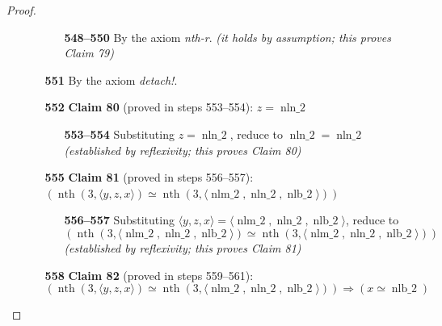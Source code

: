 \documentclass[11pt]{article}
\theoremstyle{plain}
\begin{document}
\begin{proof}
\begin{itemize}[leftmargin=2.8em, itemsep=4pt, parsep=1pt]
\begin{itemize}[leftmargin=2.8em, itemsep=4pt, parsep=1pt]
  \begin{itemize}[leftmargin=2.8em, itemsep=4pt, parsep=1pt]
  \item[\textbf{548--550}] By the axiom \emph{nth-r}.  \emph{(it holds by assumption; this proves Claim 79)}
  \end{itemize}
  \item[\textbf{551}] By the axiom \emph{detach!}.
  \item[\textbf{552}] \textbf{Claim 80} (proved in steps 553--554): $z = \operatorname{nln\_2}$
  \begin{itemize}[leftmargin=2.8em, itemsep=4pt, parsep=1pt]
  \item[\textbf{553--554}] Substituting $z = \operatorname{nln\_2}$, reduce to $\operatorname{nln\_2} = \operatorname{nln\_2}$  \emph{(established by reflexivity; this proves Claim 80)}
  \end{itemize}
  \item[\textbf{555}] \textbf{Claim 81} (proved in steps 556--557): $(\operatorname{nth}(3, \langle y, z, x \rangle) \simeq \operatorname{nth}(3, \langle \operatorname{nlm\_2}, \operatorname{nln\_2}, \operatorname{nlb\_2} \rangle))$
  \begin{itemize}[leftmargin=2.8em, itemsep=4pt, parsep=1pt]
  \item[\textbf{556--557}] Substituting $\langle y, z, x \rangle = \langle \operatorname{nlm\_2}, \operatorname{nln\_2}, \operatorname{nlb\_2} \rangle$, reduce to
\begin{equation*}
(\operatorname{nth}(3, \langle \operatorname{nlm\_2}, \operatorname{nln\_2}, \operatorname{nlb\_2} \rangle) \simeq \operatorname{nth}(3, \langle \operatorname{nlm\_2}, \operatorname{nln\_2}, \operatorname{nlb\_2} \rangle))
\end{equation*}
  \emph{(established by reflexivity; this proves Claim 81)}
  \end{itemize}
  \item[\textbf{558}] \textbf{Claim 82} (proved in steps 559--561):
\begin{equation*}
(\operatorname{nth}(3, \langle y, z, x \rangle) \simeq \operatorname{nth}(3, \langle \operatorname{nlm\_2}, \operatorname{nln\_2}, \operatorname{nlb\_2} \rangle)) \Rightarrow (x \simeq \operatorname{nlb\_2})
\end{equation*}


\end{itemize}
\end{itemize}
\end{proof}
\end{document}
